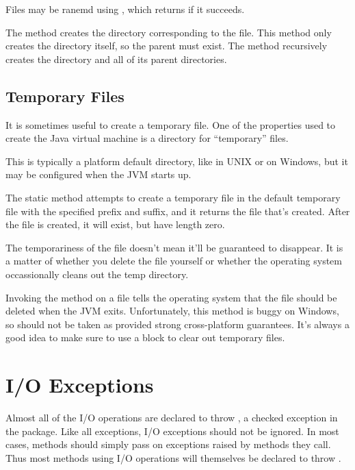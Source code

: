 Files may be ranemd using , which returns 
if it succeeds.  

The method  creates the directory corresponding to the file.
This method only creates the directory itself, so the parent must exist.
The method  recursively creates the directory and all of its
parent directories.


\subsection{Temporary Files}

It is sometimes useful to create a temporary file.  One of the
properties used to create the Java virtual machine is a directory for
``temporary'' files.  

This is typically a platform default directory, like
 in UNIX or  on Windows, but it
may be configured when the JVM starts up.

The static  method 
attempts to create a temporary file in the default temporary file with
the specified prefix and suffix, and it returns the file that's
created.  After the file is created, it will exist, but have length
zero.

The temporariness of the file doesn't mean it'll
be guaranteed to disappear.  It is a matter of whether you delete the
file yourself or whether the operating system occassionally cleans out
the temp directory.

Invoking the method  on a file tells the
operating system that the file should be deleted when the JVM exits.
Unfortunately, this method is buggy on Windows, so should not be taken
as provided strong cross-platform guarantees.  It's always a good idea
to make sure to use a  block to clear out temporary
files.  


\section{I/O Exceptions}\label{section:io-ioexception}

Almost all of the I/O operations are declared to throw
, a checked exception in the  package.
Like all exceptions, I/O exceptions should not be ignored.  In most
cases, methods should simply pass on exceptions raised by methods they
call.  Thus most methods using I/O operations will themselves be
declared to throw .  

